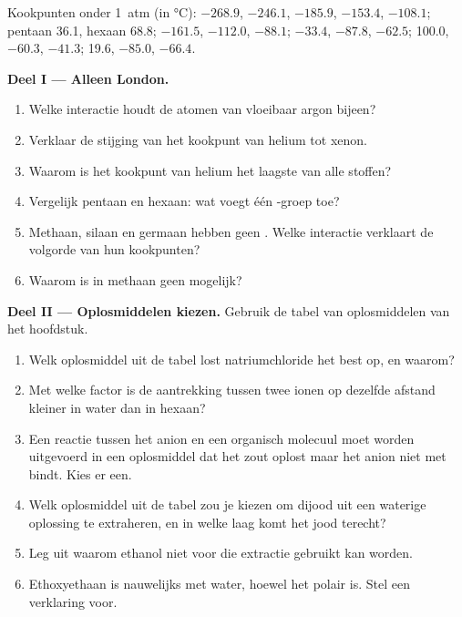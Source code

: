 \begin{problem}
\label{pb:b1:intermolecular-forces-solvents:1}
Kookpunten onder \qty{1}{atm} (in \unit{\celsius}):  $-268.9$,
 $-246.1$,  $-185.9$,  $-153.4$,  $-108.1$;
pentaan 36.1, hexaan 68.8;  $-161.5$,  $-112.0$,
 $-88.1$;  $-33.4$,  $-87.8$,  $-62.5$;
 100.0,  $-60.3$,  $-41.3$;  19.6,
 $-85.0$,  $-66.4$.

\medskip
\noindent\textbf{Deel I --- Alleen London.}
\begin{enumerate}
  \item Welke interactie houdt de atomen van vloeibaar argon bijeen?
  \item Verklaar de stijging van het kookpunt van helium tot xenon.
  \item Waarom is het kookpunt van helium het laagste van alle stoffen?
  \item Vergelijk pentaan en hexaan: wat voegt één -groep toe?
  \item Methaan, silaan en germaan hebben geen . Welke
        interactie verklaart de volgorde van hun kookpunten?
  \item Waarom is in methaan geen  mogelijk?
\end{enumerate}

\medskip
\noindent\textbf{Deel II --- Oplosmiddelen kiezen.}
Gebruik de tabel van oplosmiddelen van het hoofdstuk.
\begin{enumerate}[resume]
  \item Welk oplosmiddel uit de tabel lost natriumchloride het best op, en
        waarom?
  \item Met welke factor is de aantrekking tussen twee ionen op dezelfde
        afstand kleiner in water dan in hexaan?
  \item Een reactie tussen het anion  en een organisch molecuul
        moet worden uitgevoerd in een oplosmiddel dat het zout oplost maar
        het anion niet met  bindt. Kies er een.
  \item Welk oplosmiddel uit de tabel zou je kiezen om dijood uit een
        waterige oplossing te extraheren, en in welke laag komt het jood
        terecht?
  \item Leg uit waarom ethanol niet voor die extractie gebruikt kan
        worden.
  \item Ethoxyethaan is nauwelijks  met water, hoewel het polair
        is. Stel een verklaring voor.
\end{enumerate}


\end{problem}
